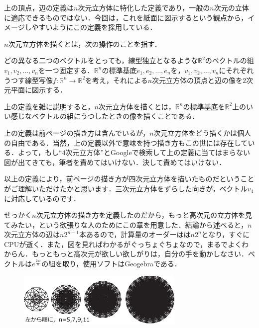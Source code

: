 \documentclass[./main]{subfiles} %
\begin{document}
\rem
上の頂点，辺の定義は$n$次元立方体に特化した定義であり，一般の$n$次元の立体に適応できるものではない．今回は，これを紙面に図示するという観点から，イメージしやすいようにこの定義を採用している．

\maskdefi [$n$次元立方体を描く]

$n$次元立方体を描くとは，次の操作のことを指す．

どの異なる二つのベクトルをとっても，線型独立となるような$\mathbb{R}^2$のベクトルの組$v_1, v_2 , \ldots , v_n$を一つ固定する．$\mathbb{R}^n$の標準基底$e_1 , e_2 , \ldots , e_n$を，$v_1,v_2, \ldots ,v_n$にそれぞれうつす線型写像$f \colon \mathbb{R}^n \rightarrow \mathbb{R}^2$を考え，それによる$n$次元立方体の頂点と辺の像を$2$次元平面に図示する．

\rem
上の定義を雑に説明すると，$n$次元立方体を描くとは，$\mathbb{R}^n$の標準基底を$\mathbb{R}^2$上のいい感じなベクトルの組にうつしたときの像を描くことである．

\rem

上の定義は前ページの描き方は含んでいるが，$n$次元立方体をどう描くかは個人の自由である．当然，上の定義以外で意味を持つ描き方もこの世には存在している．よって，もし``$4$次元立方体''とGoogleで検索して上の定義に当てはまらない図が出てきても，筆者を責めてはいけない．決して責めてはいけない．

以上の定義により，前ページの描き方が四次元立方体を描いたものだということがご理解いただけたかと思います．三次元立方体をずらした向きが，ベクトル$v_4$に対応しているのです．

せっかく$n$次元立方体の描き方を定義したのだから，もっと高次元の立方体を見てみたい，という欲張りな人のためにこの章を用意した．結論から述べると，$n$次元立方体の辺は$n2^{n-1}$本あるので，計算量のオーダーはは$n2^n$となり，すぐに{\rm CPU}が逝く．また，図を見ればわかるがぐっちょぐちょなので，まるでよくわからん．もっともっと高次元が欲しい欲しがりは，自分の手を動かしなさい．ベクトルは$e^{\frac{2\pi i}{n}}$の組を取り，使用ソフトは{\rm Geogebra}である．

\begin{figure}[h]
\begin{center}
\includegraphics[width=80mm]{mask_rittai4.eps}
\end{center}
\end{figure}
\end{document}
